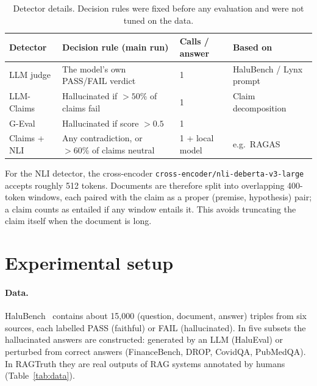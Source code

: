 \documentclass[11pt,a4paper]{article}
\newcommand{\code}[1]{\texttt{\small #1}}
\begin{document}
\begin{table}[t]
\centering\small
\caption{Detector details. Decision rules were fixed before any evaluation and were not
tuned on the data.}
\label{tab:detectors}
\begin{tabularx}{\textwidth}{@{}l X l l@{}}
\toprule
Detector & Decision rule (main run) & Calls / answer & Based on \\
\midrule
LLM judge    & The model's own PASS/FAIL verdict & 1 & HaluBench / Lynx prompt \citep{ravi2024lynx} \\
LLM-Claims   & Hallucinated if $>50\%$ of claims fail & 1 & Claim decomposition \citep{min2023factscore} \\
G-Eval       & Hallucinated if score $>0.5$ & 1 & \citet{liu2023geval} \\
Claims + NLI & Any contradiction, or $>60\%$ of claims neutral & 1 + local model & e.g.\ RAGAS \citep{es2024ragas} \\
\bottomrule
\end{tabularx}
\end{table}

For the NLI detector, the cross-encoder \code{cross-encoder/nli-deberta-v3-large}
accepts roughly 512 tokens. Documents are therefore split into overlapping 400-token
windows, each paired with the claim as a proper (premise, hypothesis) pair; a claim
counts as entailed if any window entails it. This avoids truncating the claim itself
when the document is long.

\section{Experimental setup}
\label{sec:setup}

\paragraph{Data.}
HaluBench~\citep{ravi2024lynx} contains about 15{,}000 (question, document, answer)
triples from six sources, each labelled PASS (faithful) or FAIL (hallucinated). In
five subsets the hallucinated answers are constructed: generated by an LLM (HaluEval) or
perturbed from correct answers (FinanceBench, DROP, CovidQA, PubMedQA). In RAGTruth
they are real outputs of RAG systems annotated by humans (Table~\ref{tab:data}).
\end{document}
